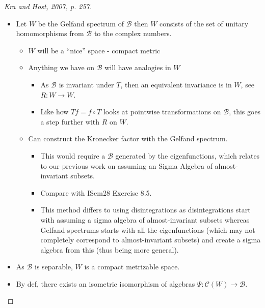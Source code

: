 \documentclass[
  british,
]{article}
\providecommand{\tightlist}{%
  \setlength{\itemsep}{0pt}\setlength{\parskip}{0pt}}
\theoremstyle{plain}
\theoremstyle{definition}
\theoremstyle{plain}
\theoremstyle{remark}
\begin{document}
\begin{proof}[{Kra and Host, 2007, p. 257}]
\begin{itemize}
  \begin{itemize}
  \tightlist
  \item
    Let \(W\) be the Gelfand spectrum of \(\mathcal{B}\) then \(W\)
    consists of the set of unitary homomorphisms from \(\mathcal{B}\) to
    the complex numbers.

    \begin{itemize}
    \tightlist
    \item
      \(W\) will be a ``nice'' space - compact metric
    \item
      Anything we have on \(\mathcal{B}\) will have analogies in \(W\)

      \begin{itemize}
      \tightlist
      \item
        As \(\mathcal{B}\) is invariant under \(T\), then an equivalent
        invariance is in \(W\), see \(R:W\rightarrow W\).
      \item
        Like how \(Tf=f\circ T\) looks at pointwise transformations on
        \(\mathcal{B}\), this goes a step further with \(R\) on \(W\).
      \end{itemize}
    \item
      Can construct the Kronecker factor with the Gelfand spectrum.

      \begin{itemize}
      \tightlist
      \item
        This would require a \(\mathcal{B}\) generated by the
        eigenfunctions, which relates to our previous work on assuming
        an Sigma Algebra of almost-invariant subsets.
      \item
        Compare with ISem28 Exercise 8.5.
      \item
        This method differs to using disintegrations as disintegrations
        start with assuming a sigma algebra of almost-invariant subsets
        whereas Gelfand spectrums starts with all the eigenfunctions
        (which may not completely correspond to almost-invariant
        subsets) and create a sigma algebra from this (thus being more
        general).
      \end{itemize}
    \end{itemize}
  \item
    As \(\mathcal{B}\) is separable, \(W\) is a compact metrizable
    space.
  \item
    By def, there exists an isometric isomorphism of algebras
    \(\Psi:\mathcal{C}(W)\rightarrow\mathcal{B}\).


\end{itemize}
\end{itemize}
\end{proof}
\end{document}
